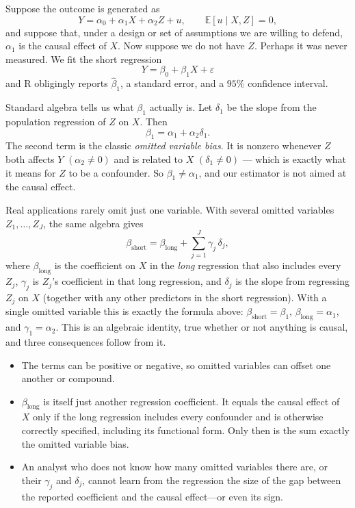 \documentclass[11pt]{report}
\newcommand{\E}{\mathbb{E}}
\begin{document}
Suppose the outcome is generated as
\[
Y=\alpha_0+\alpha_1X+\alpha_2Z+u,
\qquad
\E[u\mid X,Z]=0,
\]
and suppose that, under a design or set of assumptions we are willing to defend, \(\alpha_1\) is the causal effect of \(X\). Now suppose we do not have \(Z\). Perhaps it was never measured. We fit the short regression
\[
Y=\beta_0+\beta_1X+\varepsilon
\]
and R obligingly reports \(\widehat{\beta}_1\), a standard error, and a \(95\%\) confidence interval.

Standard algebra tells us what \(\beta_1\) actually is. Let \(\delta_1\) be the slope from the population regression of \(Z\) on \(X\). Then
\[
\beta_1=\alpha_1+\alpha_2\delta_1 .
\]
The second term is the classic \emph{omitted variable bias}. It is nonzero whenever \(Z\) both affects \(Y\) \((\alpha_2\neq 0)\) and is related to \(X\) \((\delta_1\neq 0)\) --- which is exactly what it means for \(Z\) to be a confounder. So \(\beta_1\neq\alpha_1\), and our estimator is not aimed at the causal effect.

Real applications rarely omit just one variable. With several omitted variables \(Z_1,\ldots,Z_J\), the same algebra gives
\[
\beta_{\text{short}}
=
\beta_{\text{long}}
+
\sum_{j=1}^{J}\gamma_j\,\delta_j ,
\]
where \(\beta_{\text{long}}\) is the coefficient on \(X\) in the \emph{long} regression that also includes every \(Z_j\), \(\gamma_j\) is \(Z_j\)'s coefficient in that long regression, and \(\delta_j\) is the slope from regressing \(Z_j\) on \(X\) (together with any other predictors in the short regression). With a single omitted variable this is exactly the formula above: \(\beta_{\text{short}}=\beta_1\), \(\beta_{\text{long}}=\alpha_1\), and \(\gamma_1=\alpha_2\). This is an algebraic identity, true whether or not anything is causal, and three consequences follow from it.

\begin{itemize}[leftmargin=2em]
\item The terms can be positive or negative, so omitted variables can offset one another or compound.
\item \(\beta_{\text{long}}\) is itself just another regression coefficient. It equals the causal effect of \(X\) only if the long regression includes every confounder and is otherwise correctly specified, including its functional form. Only then is the sum exactly the omitted variable bias.
\item An analyst who does not know how many omitted variables there are, or their \(\gamma_j\) and \(\delta_j\), cannot learn from the regression the size of the gap between the reported coefficient and the causal effect---or even its sign.
\end{itemize}
\end{document}
